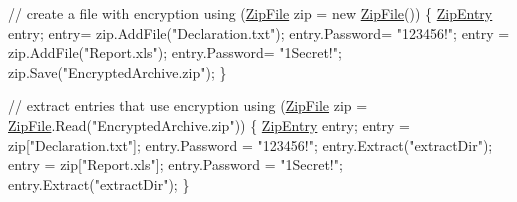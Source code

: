 \begin{DoxyCode}
\textcolor{comment}{// create a file with encryption}
\textcolor{keyword}{using} (\mbox{\hyperlink{namespace_super_tiled2_unity_1_1_ionic_1_1_zip_a9ced5352c56e7e0fceff15b534073c83a088ad16b06174c69965e232063ba6d16}{ZipFile}} zip = \textcolor{keyword}{new} \mbox{\hyperlink{namespace_super_tiled2_unity_1_1_ionic_1_1_zip_a9ced5352c56e7e0fceff15b534073c83a088ad16b06174c69965e232063ba6d16}{ZipFile}}())
\{
    \mbox{\hyperlink{class_super_tiled2_unity_1_1_ionic_1_1_zip_1_1_zip_entry_a440b6d4d136b20dc6bdbdd399397e3a0}{ZipEntry}} entry;
    entry= zip.AddFile(\textcolor{stringliteral}{"Declaration.txt"});
    entry.Password= \textcolor{stringliteral}{"123456!"};
    entry = zip.AddFile(\textcolor{stringliteral}{"Report.xls"});
    entry.Password= \textcolor{stringliteral}{"1Secret!"};
    zip.Save(\textcolor{stringliteral}{"EncryptedArchive.zip"});
\}

\textcolor{comment}{// extract entries that use encryption}
\textcolor{keyword}{using} (\mbox{\hyperlink{namespace_super_tiled2_unity_1_1_ionic_1_1_zip_a9ced5352c56e7e0fceff15b534073c83a088ad16b06174c69965e232063ba6d16}{ZipFile}} zip = \mbox{\hyperlink{namespace_super_tiled2_unity_1_1_ionic_1_1_zip_a9ced5352c56e7e0fceff15b534073c83a088ad16b06174c69965e232063ba6d16}{ZipFile}}.Read(\textcolor{stringliteral}{"EncryptedArchive.zip"}))
\{
    \mbox{\hyperlink{class_super_tiled2_unity_1_1_ionic_1_1_zip_1_1_zip_entry_a440b6d4d136b20dc6bdbdd399397e3a0}{ZipEntry}} entry;
    entry = zip[\textcolor{stringliteral}{"Declaration.txt"}];
    entry.Password = \textcolor{stringliteral}{"123456!"};
    entry.Extract(\textcolor{stringliteral}{"extractDir"});
    entry = zip[\textcolor{stringliteral}{"Report.xls"}];
    entry.Password = \textcolor{stringliteral}{"1Secret!"};
    entry.Extract(\textcolor{stringliteral}{"extractDir"});
\}
\end{DoxyCode}



